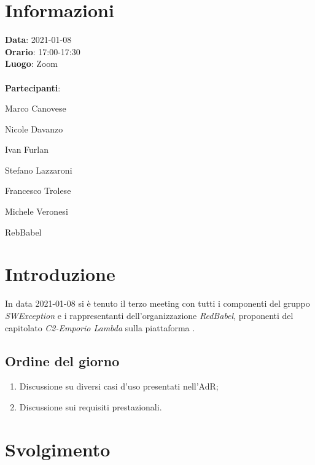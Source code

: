\section{Informazioni}
\textbf{Data}: 2021-01-08\\
\textbf{Orario}: 17:00-17:30\\
\textbf{Luogo}: Zoom\\\\
\textbf{Partecipanti}:\begin{list}{*}{\setlength{\itemsep}{0cm}}
	\item Marco Canovese
	\item Nicole Davanzo
	\item Ivan Furlan
	\item Stefano Lazzaroni
	\item Francesco Trolese
	\item Michele Veronesi
	\item RebBabel
\end{list}

\section{Introduzione}
In data 2021-01-08 si è tenuto il terzo meeting con tutti i componenti del gruppo \textit{SWException} e i rappresentanti dell'organizzazione \textit{RedBabel}, proponenti del capitolato \textit{C2-Emporio Lambda} sulla piattaforma . \\

\subsection{Ordine del giorno}
\begin{enumerate}
    \item Discussione su diversi casi d'uso presentati nell'AdR;
    \item Discussione sui requisiti prestazionali.
\end{enumerate}

\section{Svolgimento}


